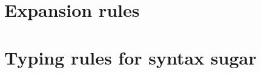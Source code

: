 \documentclass{article}
\begin{document}
\section{Expansion rules}

\section{Typing rules for syntax sugar}
\end{document}
